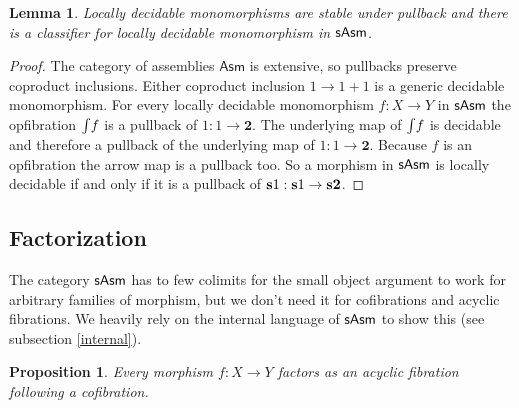 \documentclass{amsart}
\theoremstyle{plain}
\newtheorem{lemma}[theorem]{Lemma}
\newtheorem{prop}[theorem]{Proposition}
\theoremstyle{definition}
\newcommand\Asm{\mathsf{Asm}}
\newcommand\sier{{\mathbf 2}}
\begin{document}
\begin{lemma} Locally decidable monomorphisms are stable under pullback and there is a classifier for locally decidable monomorphism in $\mathsf{sAsm}$. \label{lodeuni} \end{lemma}

\begin{proof} The category of assemblies $\Asm$ is extensive, so pullbacks preserve coproduct inclusions. Either coproduct inclusion $1\to 1+1$ is a generic decidable monomorphism. For every locally decidable monomorphism $f:X \to Y$ in $\mathsf{sAsm}$ the opfibration $\mathord{\int} f$ is a pullback of $1:1\to \sier$. The underlying map of $\mathord{\int} f$ is decidable and therefore a pullback of the underlying map of $1:1\to \sier$. Because $f$ is an opfibration the arrow map is a pullback too. So a morphism in $\mathsf{sAsm}$ is locally decidable if and only if it is a pullback of $\rat 1:\rat 1\to \rat \sier$.
\end{proof}

\subsection{Factorization}
The category $\mathsf{sAsm}$ has to few colimits for the small object argument to work for arbitrary families of morphism, but we don't need it for cofibrations and acyclic fibrations. We heavily rely on the internal language of $\mathsf{sAsm}$ to show this (see subsection \ref{internal}).

\begin{prop} Every morphism $f:X\to Y$ factors as an acyclic fibration following a cofibration. \label{factor1} \end{prop}
\end{document}
